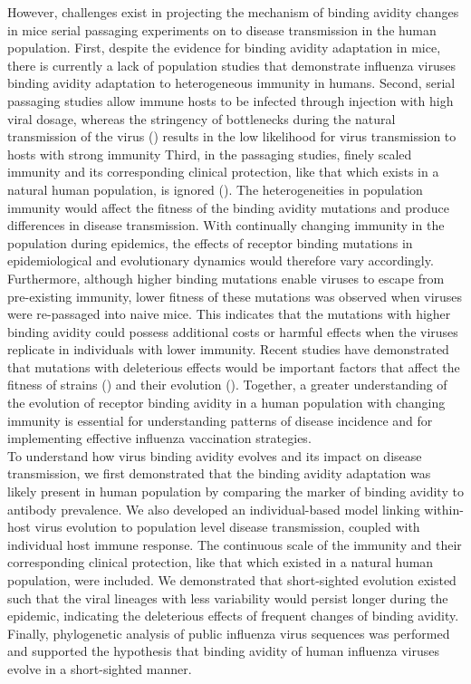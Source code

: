 \documentclass[12pt,a4paper]{article}
\begin{document}
However, challenges exist in projecting the mechanism of binding avidity changes in mice serial passaging experiments on to disease transmission in the human population. First, despite the evidence for binding avidity adaptation in mice, there is currently a lack of population studies that demonstrate influenza viruses binding avidity adaptation to heterogeneous immunity in humans. Second, serial passaging studies allow immune hosts to be infected through injection with high viral dosage, whereas  the stringency of bottlenecks during the natural transmission of the virus (\cite{Varble2014}) results in the low likelihood for virus transmission to hosts with strong immunity  Third, in the passaging studies, finely scaled immunity and its corresponding clinical protection, like that which exists in a natural human population, is ignored (\cite{Yuan2016}). The heterogeneities in population immunity would affect the fitness of the binding avidity mutations and produce differences in disease transmission. With continually changing immunity in the population during epidemics, the effects of receptor binding mutations in epidemiological and evolutionary dynamics would therefore vary accordingly. Furthermore, although higher binding mutations enable viruses to escape from pre-existing immunity, lower fitness of these mutations was observed when viruses were re-passaged into naive mice. This indicates that the mutations with higher binding avidity could possess additional costs or harmful effects when the viruses replicate in individuals with lower immunity. Recent studies have demonstrated that mutations with deleterious effects would be important factors that affect the fitness of strains (\cite{Luksza2014}) and their evolution (\cite{Koelle2015}). Together, a greater understanding of the evolution of receptor binding avidity in a human population with changing immunity is essential for understanding patterns of disease incidence and for implementing effective influenza vaccination strategies. \\
To understand how virus binding avidity evolves and its impact on disease transmission, we first demonstrated that the binding avidity adaptation was likely present in human population by comparing the marker of binding avidity to antibody prevalence. We also developed an individual-based model linking within-host virus evolution to population level disease transmission, coupled with individual host immune response. The continuous scale of the immunity and their corresponding clinical protection, like that which existed in a natural human population, were included. We demonstrated that short-sighted evolution existed such that the viral lineages with less variability would persist longer during the epidemic, indicating the deleterious effects of frequent changes of binding avidity.  Finally, phylogenetic analysis of public influenza virus sequences was performed and supported the hypothesis that  binding avidity of human influenza viruses evolve in a short-sighted manner. \\
\clearpage
\end{document}
